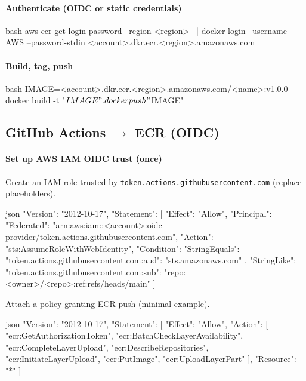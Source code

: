 \documentclass[11pt]{article}
\begin{document}
\paragraph{Authenticate (OIDC or static credentials)}
\begin{code}{bash}
aws ecr get-login-password --region <region> \
| docker login --username AWS --password-stdin <account>.dkr.ecr.<region>.amazonaws.com
\end{code}

\paragraph{Build, tag, push}
\begin{code}{bash}
IMAGE=<account>.dkr.ecr.<region>.amazonaws.com/<name>:v1.0.0
docker build -t "$IMAGE" .
docker push "$IMAGE"
\end{code}
\clearpage

\subsection{GitHub Actions \texorpdfstring{$\rightarrow$}{->} ECR (OIDC)}
\paragraph{Set up AWS IAM OIDC trust (once)}
Create an IAM role trusted by \nolinkurl{token.actions.githubusercontent.com} (replace placeholders).
\begin{code}{json}
{
  "Version": "2012-10-17",
  "Statement": [{
    "Effect": "Allow",
    "Principal": {"Federated": "arn:aws:iam::<account>:oidc-provider/token.actions.githubusercontent.com"},
    "Action": "sts:AssumeRoleWithWebIdentity",
    "Condition": {
      "StringEquals": {
        "token.actions.githubusercontent.com:aud": "sts.amazonaws.com"
      },
      "StringLike": {
        "token.actions.githubusercontent.com:sub": "repo:<owner>/<repo>:ref:refs/heads/main"
      }
    }
  }]
}
\end{code}

Attach a policy granting ECR push (minimal example).
\begin{code}{json}
{
  "Version": "2012-10-17",
  "Statement": [{
    "Effect": "Allow",
    "Action": [
      "ecr:GetAuthorizationToken",
      "ecr:BatchCheckLayerAvailability",
      "ecr:CompleteLayerUpload",
      "ecr:DescribeRepositories",
      "ecr:InitiateLayerUpload",
      "ecr:PutImage",
      "ecr:UploadLayerPart"
    ],
    "Resource": "*"
  }]
}
\end{code}
\clearpage
\end{document}
